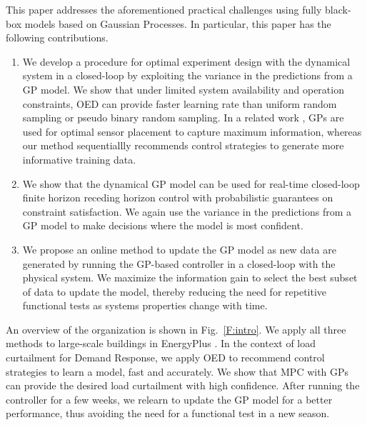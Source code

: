 This paper addresses the aforementioned practical challenges using fully black-box models based on Gaussian Processes.
In particular, this paper has the following contributions.
\begin{enumerate}
	\item We develop a procedure for optimal experiment design with the dynamical system in a closed-loop by exploiting the variance in the predictions from a GP model. We show that under limited system availability and operation constraints, OED can provide faster learning rate than uniform random sampling or pseudo binary random sampling. In a related work \cite{Krause2008}, GPs are used for optimal sensor placement to capture maximum information, whereas our method sequentiallly recommends control strategies to generate more informative training data.
	
	\item We show that the dynamical GP model can be used for real-time closed-loop finite horizon receding horizon control with probabilistic guarantees on constraint satisfaction. We again use the variance in the predictions from a GP model to make decisions where the model is most confident.
	
	\item We propose an online method to update the GP model as new data are generated by running the GP-based controller in a closed-loop with the physical system. We maximize the information gain to select the best subset of data to update the model, thereby reducing the need for repetitive functional tests as systems properties change with time.
	
\end{enumerate}
An overview of the organization is shown in Fig.~\ref{F:intro}.
We apply all three methods to large-scale buildings in EnergyPlus \cite{Deru2011}. 
In the context of load curtailment for Demand Response, we apply OED to recommend control strategies to learn a model, fast and accurately. We show that MPC with GPs can provide the desired load curtailment with high confidence. After running the controller for a few weeks, we relearn to update the GP model for a better performance, thus avoiding the need for a functional test in a new season.

